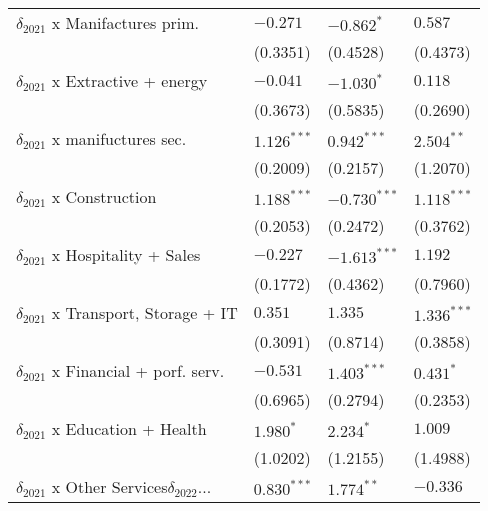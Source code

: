 \begin{tabular}{llll}
$\delta_{2021}$ x Manifactures prim.               &           $-0.271$ &         $-0.862^*$ &            $0.587$ \\
                                                   &           (0.3351) &           (0.4528) &           (0.4373) \\
$\delta_{2021}$ x Extractive + energy              &           $-0.041$ &         $-1.030^*$ &            $0.118$ \\
                                                   &           (0.3673) &           (0.5835) &           (0.2690) \\
$\delta_{2021}$ x manifuctures sec.                &      $1.126^{***}$ &      $0.942^{***}$ &       $2.504^{**}$ \\
                                                   &           (0.2009) &           (0.2157) &           (1.2070) \\
$\delta_{2021}$ x Construction                     &      $1.188^{***}$ &     $-0.730^{***}$ &      $1.118^{***}$ \\
                                                   &           (0.2053) &           (0.2472) &           (0.3762) \\
$\delta_{2021}$ x Hospitality + Sales              &           $-0.227$ &     $-1.613^{***}$ &            $1.192$ \\
                                                   &           (0.1772) &           (0.4362) &           (0.7960) \\
$\delta_{2021}$ x Transport, Storage + IT          &            $0.351$ &            $1.335$ &      $1.336^{***}$ \\
                                                   &           (0.3091) &           (0.8714) &           (0.3858) \\
$\delta_{2021}$ x Financial + porf. serv.          &           $-0.531$ &      $1.403^{***}$ &          $0.431^*$ \\
                                                   &           (0.6965) &           (0.2794) &           (0.2353) \\
$\delta_{2021}$ x Education + Health               &          $1.980^*$ &          $2.234^*$ &            $1.009$ \\
                                                   &           (1.0202) &           (1.2155) &           (1.4988) \\
$\delta_{2021}$ x Other Services$\delta_{2022}$... &      $0.830^{***}$ &       $1.774^{**}$ &           $-0.336$ \\

\end{tabular}
